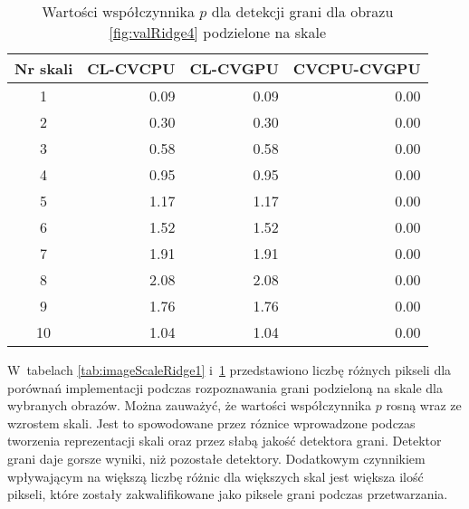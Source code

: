 \begin{center}
\begin{table}
\centering
\caption{Wartości współczynnika $ p $ dla detekcji grani dla obrazu \ref{fig:valRidge4} podzielone na skale}
\label{tab:imageScaleRidge4}
\begin{tabular}{|c|r|r|r|}
 \hline
Nr skali & CL-CVCPU & CL-CVGPU & CVCPU-CVGPU \\ \hline
1        & 0.09     & 0.09     & 0.00        \\ \hline
2        & 0.30     & 0.30     & 0.00        \\ \hline
3        & 0.58     & 0.58     & 0.00        \\ \hline
4        & 0.95     & 0.95     & 0.00        \\ \hline
5        & 1.17     & 1.17     & 0.00        \\ \hline
6        & 1.52     & 1.52     & 0.00        \\ \hline
7        & 1.91     & 1.91     & 0.00        \\ \hline
8        & 2.08     & 2.08     & 0.00        \\ \hline
9        & 1.76     & 1.76     & 0.00        \\ \hline
10       & 1.04     & 1.04     & 0.00        \\ \hline
\end{tabular}
\end{table}
\end{center}

W~tabelach \ref{tab:imageScaleRidge1} i~\ref{tab:imageScaleRidge4} przedstawiono liczbę różnych pikseli dla porównań implementacji podczas rozpoznawania grani podzieloną na skale dla wybranych obrazów. Można zauważyć, że wartości współczynnika $ p $ rosną wraz ze wzrostem skali. Jest to spowodowane przez róznice wprowadzone podczas tworzenia reprezentacji skali oraz przez słabą jakość detektora grani. Detektor grani daje gorsze wyniki, niż pozostałe detektory. Dodatkowym czynnikiem wpływającym na większą liczbę różnic dla większych skal jest większa ilość pikseli, które zostały zakwalifikowane jako piksele grani podczas przetwarzania.
